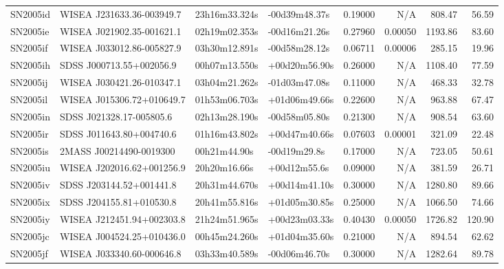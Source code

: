 \begin{longtable}{llllrrrr}
SN2005id         &       WISEA J231633.36-003949.7 &   23h16m33.324s &   -00d39m48.37s &  0.19000 &      N/A &   808.47 &       56.59 \\
SN2005ie         &       WISEA J021902.35-001621.1 &   02h19m02.353s &   -00d16m21.26s &  0.27960 &  0.00050 &  1193.86 &       83.60 \\
SN2005if         &       WISEA J033012.86-005827.9 &   03h30m12.891s &   -00d58m28.12s &  0.06711 &  0.00006 &   285.15 &       19.96 \\
SN2005ih         &        SDSS J000713.55+002056.9 &   00h07m13.550s &   +00d20m56.90s &  0.26000 &      N/A &  1108.40 &       77.59 \\
SN2005ij         &       WISEA J030421.26-010347.1 &   03h04m21.262s &   -01d03m47.08s &  0.11000 &      N/A &   468.33 &       32.78 \\
SN2005il         &       WISEA J015306.72+010649.7 &   01h53m06.703s &   +01d06m49.66s &  0.22600 &      N/A &   963.88 &       67.47 \\
SN2005in         &        SDSS J021328.17-005805.6 &   02h13m28.190s &   -00d58m05.80s &  0.21300 &      N/A &   908.54 &       63.60 \\
SN2005ir         &        SDSS J011643.80+004740.6 &   01h16m43.802s &   +00d47m40.66s &  0.07603 &  0.00001 &   321.09 &       22.48 \\
SN2005is         &         2MASS J00214490-0019300 &    00h21m44.90s &    -00d19m29.8s &  0.17000 &      N/A &   723.05 &       50.61 \\
SN2005iu         &       WISEA J202016.62+001256.9 &    20h20m16.66s &    +00d12m55.6s &  0.09000 &      N/A &   381.59 &       26.71 \\
SN2005iv         &        SDSS J203144.52+001441.8 &   20h31m44.670s &   +00d14m41.10s &  0.30000 &      N/A &  1280.80 &       89.66 \\
SN2005ix         &        SDSS J204155.81+010530.8 &   20h41m55.816s &   +01d05m30.85s &  0.25000 &      N/A &  1066.50 &       74.66 \\
SN2005iy         &       WISEA J212451.94+002303.8 &   21h24m51.965s &   +00d23m03.33s &  0.40430 &  0.00050 &  1726.82 &      120.90 \\
SN2005jc         &       WISEA J004524.25+010436.0 &   00h45m24.260s &   +01d04m35.60s &  0.21000 &      N/A &   894.54 &       62.62 \\
SN2005jf         &       WISEA J033340.60-000646.8 &   03h33m40.589s &   -00d06m46.70s &  0.30000 &      N/A &  1282.64 &       89.78 \\

\end{longtable}
